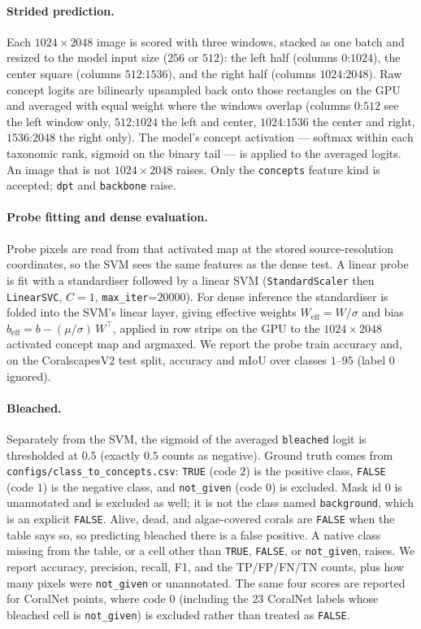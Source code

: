 \paragraph{Strided prediction.}
Each $1024\times2048$ image is scored with three windows, stacked as one batch
and resized to the model input size ($256$ or $512$): the left half (columns
$0$:$1024$), the center square (columns $512$:$1536$), and the right half
(columns $1024$:$2048$). Raw concept logits are bilinearly upsampled back onto
those rectangles on the GPU and averaged with equal weight where the windows
overlap (columns $0$:$512$ see the left window only, $512$:$1024$ the left and
center, $1024$:$1536$ the center and right, $1536$:$2048$ the right only). The
model's concept activation --- softmax within each taxonomic rank, sigmoid on
the binary tail --- is applied to the averaged logits. An image that is not
$1024\times2048$ raises. Only the \texttt{concepts} feature kind is accepted;
\texttt{dpt} and \texttt{backbone} raise.

\paragraph{Probe fitting and dense evaluation.}
Probe pixels are read from that activated map at the stored source-resolution
coordinates, so the SVM sees the same features as the dense test. A linear probe
is fit with a standardiser followed by a linear SVM
(\texttt{StandardScaler} then \texttt{LinearSVC}, $C=1$,
\texttt{max\_iter}=$20000$). For dense inference the standardiser is folded into
the SVM's linear layer, giving effective weights
$W_\mathrm{eff}=W/\sigma$ and bias
$b_\mathrm{eff}=b - (\mu/\sigma)\,W^{\!\top}$, applied in row strips on the GPU
to the $1024\times2048$ activated concept map and argmaxed. We report the probe
train accuracy and, on the CoralscapesV2 test split, accuracy and mIoU over
classes $1$--$95$ (label $0$ ignored).

\paragraph{Bleached.}
Separately from the SVM, the sigmoid of the averaged \texttt{bleached} logit is
thresholded at $0.5$ (exactly $0.5$ counts as negative). Ground truth comes from
\texttt{configs/class\_to\_concepts.csv}: \texttt{TRUE} (code $2$) is the
positive class, \texttt{FALSE} (code $1$) is the negative class, and
\texttt{not\_given} (code $0$) is excluded. Mask id $0$ is unannotated and is
excluded as well; it is not the class named \texttt{background}, which is an
explicit \texttt{FALSE}. Alive, dead, and algae-covered corals are \texttt{FALSE}
when the table says so, so predicting bleached there is a false positive. A
native class missing from the table, or a cell other than \texttt{TRUE},
\texttt{FALSE}, or \texttt{not\_given}, raises. We report accuracy, precision,
recall, F1, and the TP/FP/FN/TN counts, plus how many pixels were
\texttt{not\_given} or unannotated. The same four scores are reported for
CoralNet points, where code $0$ (including the $23$ CoralNet labels whose
bleached cell is \texttt{not\_given}) is excluded rather than treated as
\texttt{FALSE}.

